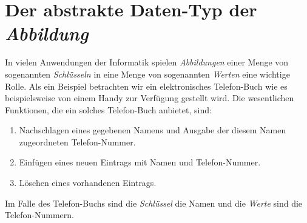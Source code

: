 \section{Der abstrakte Daten-Typ der \emph{Abbildung}} 
In vielen Anwendungen der Informatik spielen \emph{Abbildungen} einer Menge von
sogenannten \emph{Schl\"usseln} in eine Menge von sogenannten \emph{Werten} eine wichtige
Rolle. Als ein Beispiel betrachten wir ein elektronisches Telefon-Buch wie es
beispielsweise von einem Handy zur Verf\"ugung gestellt wird.  Die wesentlichen
Funktionen, die ein solches Telefon-Buch anbietet, sind:
\begin{enumerate}
\item Nachschlagen eines gegebenen Namens und Ausgabe der diesem Namen zugeordneten
      Telefon-Nummer.
\item Einf\"ugen eines neuen Eintrags mit Namen und Telefon-Nummer.
\item L\"oschen eines vorhandenen Eintrags.
\end{enumerate}
Im Falle des Telefon-Buchs sind die \emph{Schl\"ussel} die Namen und die \emph{Werte} sind
die Telefon-Nummern.  

